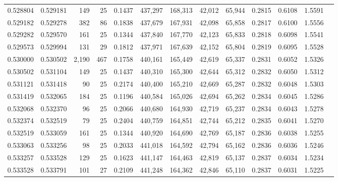 \begin{tabular}{rrrrrrrrrrrrr}
0.528804 & 0.529181 &   149 &  25 &                                     0.1437 & 437,297 & 168,313 &  42,012 &  65,944 & 0.2815 & 0.6108 & 1.5591 \\
0.529182 & 0.529278 &   382 &  86 &                                     0.1838 & 437,679 & 167,931 &  42,098 &  65,858 & 0.2817 & 0.6100 & 1.5556 \\
0.529282 & 0.529570 &   161 &  25 &                                     0.1344 & 437,840 & 167,770 &  42,123 &  65,833 & 0.2818 & 0.6098 & 1.5541 \\
0.529573 & 0.529994 &   131 &  29 &                                     0.1812 & 437,971 & 167,639 &  42,152 &  65,804 & 0.2819 & 0.6095 & 1.5528 \\
0.530000 & 0.530502 & 2,190 & 467 &                                     0.1758 & 440,161 & 165,449 &  42,619 &  65,337 & 0.2831 & 0.6052 & 1.5326 \\
0.530502 & 0.531104 &   149 &  25 &                                     0.1437 & 440,310 & 165,300 &  42,644 &  65,312 & 0.2832 & 0.6050 & 1.5312 \\
0.531121 & 0.531418 &    90 &  25 &                                     0.2174 & 440,400 & 165,210 &  42,669 &  65,287 & 0.2832 & 0.6048 & 1.5303 \\
0.531419 & 0.532065 &   184 &  25 &                                     0.1196 & 440,584 & 165,026 &  42,694 &  65,262 & 0.2834 & 0.6045 & 1.5286 \\
0.532068 & 0.532370 &    96 &  25 &                                     0.2066 & 440,680 & 164,930 &  42,719 &  65,237 & 0.2834 & 0.6043 & 1.5278 \\
0.532374 & 0.532519 &    79 &  25 &                                     0.2404 & 440,759 & 164,851 &  42,744 &  65,212 & 0.2835 & 0.6041 & 1.5270 \\
0.532519 & 0.533059 &   161 &  25 &                                     0.1344 & 440,920 & 164,690 &  42,769 &  65,187 & 0.2836 & 0.6038 & 1.5255 \\
0.533063 & 0.533256 &    98 &  25 &                                     0.2033 & 441,018 & 164,592 &  42,794 &  65,162 & 0.2836 & 0.6036 & 1.5246 \\
0.533257 & 0.533528 &   129 &  25 &                                     0.1623 & 441,147 & 164,463 &  42,819 &  65,137 & 0.2837 & 0.6034 & 1.5234 \\
0.533528 & 0.533791 &   101 &  27 &                                     0.2109 & 441,248 & 164,362 &  42,846 &  65,110 & 0.2837 & 0.6031 & 1.5225 \\

\end{tabular}
